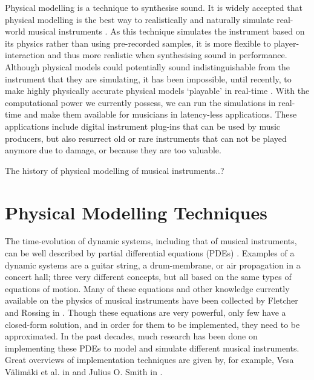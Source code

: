 Physical modelling %
is a technique \SWcomment[/approach] to synthesise sound. It is widely accepted that physical modelling is the best way to realistically and naturally simulate real-world musical instruments \cite{Valimaki2006, Smith2010b, theBible}. As this technique simulates the instrument based on its physics rather than using pre-recorded samples, it is more flexible to player-interaction and thus more realistic when synthesising sound in performance. Although physical models could potentially sound indistinguishable from the instrument that they are simulating, it has been impossible, until recently, to make highly physically accurate physical models ‘playable’ in real-time \cite{Smith2010a}. With the computational power we currently possess, we can run the simulations in real-time and make them available for musicians in latency-less applications. These applications include digital instrument plug-ins that can be used by music producers, but also resurrect old or rare instruments that can not be played anymore due to damage, or because they are too valuable. 


The history of physical modelling of musical instruments..?

\section{Physical Modelling Techniques}\label{sec:physModTech}
The time-evolution of dynamic systems, including that of musical instruments, can be well described by partial differential equations (PDEs) \cite{Fletcher1998, theBible}. Examples of a dynamic systems are a guitar string, a drum-membrane, or air propagation in a concert hall; three very different concepts, but all based on the same types of equations of motion. Many of these equations and other knowledge currently available on the physics of musical instruments have been collected by Fletcher and Rossing in \cite{Fletcher1998}. Though these equations are very powerful, only few have a closed-form solution, and in order for them to be implemented, they need to be approximated. In the past decades, much research has been done on implementing these PDEs to model and simulate different musical instruments. Great overviews of implementation techniques are given by, for example, Vesa V{\"a}lim{\"a}ki et al. in \cite{Valimaki2006} and Julius O. Smith in \cite{Smith2010a, Smith2010b}. 

